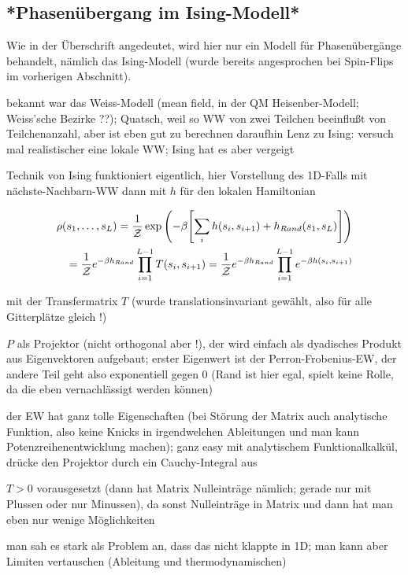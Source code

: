 	\subsection{*Phasenübergang im Ising-Modell*}
Wie in der Überschrift angedeutet, wird hier nur ein Modell für Phasenübergänge behandelt, nämlich das Ising-Modell (wurde bereits angesprochen bei Spin-Flips im vorherigen Abschnitt).

bekannt war das Weiss-Modell (mean field, in der QM Heisenber-Modell; Weiss'sche Bezirke ??); Quatsch, weil so WW von zwei Teilchen beeinflußt von Teilchenanzahl, aber ist eben gut zu berechnen
daraufhin Lenz zu Ising: versuch mal realistischer eine lokale WW; Ising hat es aber vergeigt

Technik von Ising funktioniert eigentlich, hier Vorstellung des 1D-Falls mit nächste-Nachbarn-WW
dann mit $h$ für den lokalen Hamiltonian

\begin{align}\label{key}
\rho(s_1, \dots, s_L) = \frac{1}{\mathcal{Z}} \exp\qty(-\beta \qty[\sum\limits_i h(s_i, s_{i+1}) + h_{Rand}(s_1, s_L)])
\\
= \frac{1}{\mathcal{Z}} e^{-\beta h_{Rand}} \prod_{i=1}^{L-1} T(s_i, s_{i+1}) = \frac{1}{\mathcal{Z}} e^{-\beta h_{Rand}} \prod_{i=1}^{L-1} e^{-\beta h(s_i, s_{i+1})}
\end{align}

mit der Transfermatrix $T$ (wurde translationsinvariant gewählt, also für alle Gitterplätze gleich !)

$P$ als Projektor (nicht orthogonal aber !), der wird einfach als dyadisches Produkt aus Eigenvektoren aufgebaut; erster Eigenwert ist der Perron-Frobenius-EW, der andere Teil geht also exponentiell gegen 0 (Rand ist hier egal, spielt keine Rolle, da die eben vernachlässigt werden können)

der EW hat ganz tolle Eigenschaften (bei Störung der Matrix auch analytische Funktion, also keine Knicks in irgendwelchen Ableitungen und man kann Potenzreihenentwicklung machen); ganz easy mit analytischem Funktionalkalkül, drücke den Projektor durch ein Cauchy-Integral aus

$T > 0$ vorausgesetzt (dann hat Matrix Nulleinträge nämlich; gerade nur mit Plussen oder nur Minussen), da sonst Nulleinträge in Matrix und dann hat man eben nur wenige Möglichkeiten


man sah es stark als Problem an, dass das nicht klappte in 1D; man kann aber Limiten vertauschen (Ableitung und thermodynamischen)

